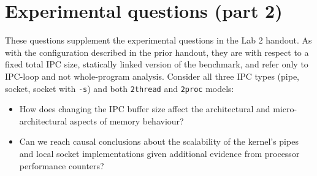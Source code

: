 \documentclass[a4paper,10pt]{article}
\begin{document}
\section*{Experimental questions (part 2)}

These questions supplement the experimental questions in the Lab 2 handout.
As with the configuration described in the prior handout, they are with
respect to a fixed total IPC size, statically linked version of the benchmark,
and refer only to IPC-loop and not whole-program analysis.
Consider all three IPC types (pipe, socket, socket with \texttt{-s}) and both
\texttt{2thread} and \texttt{2proc} models:

\begin{itemize}
  \item How does changing the IPC buffer size affect the architectural and
    micro-architectural aspects of memory behaviour?
  \item Can we reach causal conclusions about the scalability of the kernel's
    pipes and local socket implementations given additional evidence from
    processor performance counters?
\end{itemize}
\end{document}
